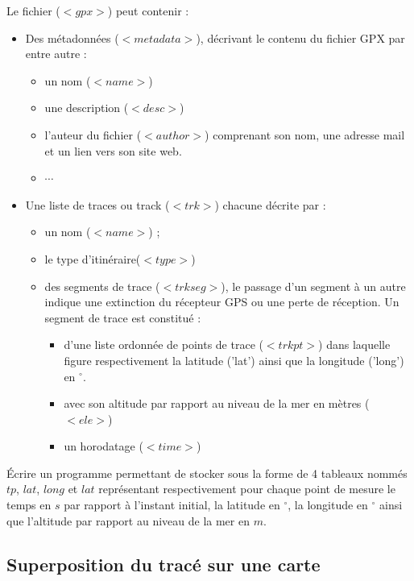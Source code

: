 Le fichier ($<gpx>$) peut contenir :
\begin{itemize}
\item Des métadonnées ($<metadata>$), décrivant le contenu du fichier GPX par entre autre :
\begin{itemize}
\item un nom ($<name>$)
\item une description ($<desc>$)
\item l'auteur du fichier ($<author>$) comprenant son nom, une adresse mail et un lien vers son site web.
\item $\cdots$
\end{itemize}
\item Une liste de traces ou track ($<trk>$) chacune décrite par :
\begin{itemize}
\item un nom ($<name>$) ;
\item  le type d'itinéraire($<type>$)
\item des segments de trace ($<trkseg>$), le passage d'un segment à un autre indique une extinction du récepteur GPS ou une perte de réception. Un segment de trace est constitué :
\begin{itemize}
\item d'une liste ordonnée de points de trace ($<trkpt>$) dans laquelle figure respectivement la latitude ('lat') ainsi que la longitude ('long') en $^{\circ}$.
\item avec son altitude par rapport au niveau de la mer en mètres ($<ele>$)
\item un horodatage ($<time>$)
\end{itemize}
\end{itemize}
\end{itemize}


\question{} Écrire un programme permettant de stocker sous la forme de 4 tableaux nommés $tp$, $lat$, $long$ et $lat$ représentant respectivement pour chaque point de mesure le temps en $s$ par rapport à l'instant initial, la latitude en $^{\circ}$, la longitude en $^{\circ}$ ainsi que l'altitude par rapport au niveau de la mer en $m$.

\subsection{Superposition du tracé sur une carte}

